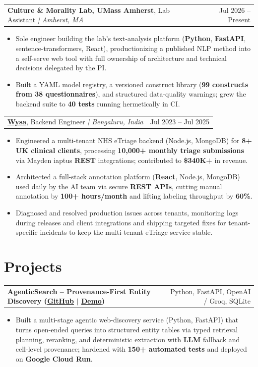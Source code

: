 \documentclass[letterpaper,11pt]{article}
\makeatletter
\newcommand{\expItem}[4]{%
  \vspace{2pt}
  \begin{tabular*}{\textwidth}{@{}l@{\extracolsep{\fill}}r@{}}
    \textbf{#1}, #2 \textit{| #3} & #4 \\
  \end{tabular*}\par\vspace{-3pt}
}
\newcommand{\projItem}[2]{%
  \vspace{2pt}
  \begin{tabular*}{\textwidth}{@{}l@{\extracolsep{\fill}}r@{}}
    \textbf{#1} & #2 \\
  \end{tabular*}\par\vspace{-3pt}
}
\makeatother
\begin{document}
\expItem{Culture \& Morality Lab, UMass Amherst}{Lab Assistant}{Amherst, MA}{Jul 2026 -- Present}
\begin{itemize}
  \item Sole engineer building the lab's text-analysis platform (\textbf{Python}, \textbf{FastAPI}, sentence-transformers, React), productionizing a published NLP method into a self-serve web tool with full ownership of architecture and technical decisions delegated by the PI.
  \item Built a YAML model registry, a versioned construct library (\textbf{99 constructs from 38 questionnaires}), and structured data-quality warnings; grew the backend suite to \textbf{40 tests} running hermetically in CI.
\end{itemize}

\expItem{\href{https://www.wysa.io}{Wysa}}{Backend Engineer}{Bengaluru, India}{Jul 2023 -- Jul 2025}
\begin{itemize}
  \item Engineered a multi-tenant NHS eTriage backend (Node.js, MongoDB) for \textbf{8+ UK clinical clients}, processing \textbf{10{,}000+ monthly triage submissions} via Mayden iaptus \textbf{REST} integrations; contributed to \textbf{\$340K+} in revenue.
  \item Architected a full-stack annotation platform (\textbf{React}, Node.js, MongoDB) used daily by the AI team via secure \textbf{REST APIs}, cutting manual annotation by \textbf{100+ hours/month} and lifting labeling throughput by \textbf{60\%}.
  \item Diagnosed and resolved production issues across tenants, monitoring logs during releases and client integrations and shipping targeted fixes for tenant-specific incidents to keep the multi-tenant eTriage service stable.
\end{itemize}

\section{Projects}

\projItem{AgenticSearch -- Provenance-First Entity Discovery {\normalfont\small(\href{https://github.com/Deva-1903/ciir_agentic_search}{GitHub} $\vert$ \href{https://agentic-search-negglszkwa-uc.a.run.app}{Demo})}}{Python, FastAPI, OpenAI / Groq, SQLite}
\begin{itemize}
  \item Built a multi-stage agentic web-discovery service (Python, FastAPI) that turns open-ended queries into structured entity tables via typed retrieval planning, reranking, and deterministic extraction with \textbf{LLM} fallback and cell-level provenance; hardened with \textbf{150+ automated tests} and deployed on \textbf{Google Cloud Run}.
\end{itemize}
\end{document}

